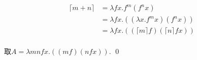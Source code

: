 \begin{pf} \rm 
$$
\begin{aligned}
\lceil m + n\rceil 
&= \lambda f x. f^m(f^n x) \\
&= \lambda f x. ((\lambda x. f^m x) (f^n x)) \\
&= \lambda f x. ((\lceil m\rceil f) (\lceil n\rceil f x))  \\       
\end{aligned}
$$

取$A=\lambda mnfx.((mf)(nfx))$.
    \qed 
\end{pf}